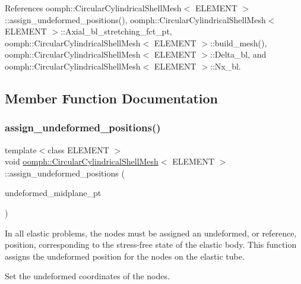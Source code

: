 References oomph\+::\+Circular\+Cylindrical\+Shell\+Mesh$<$ E\+L\+E\+M\+E\+N\+T $>$\+::assign\+\_\+undeformed\+\_\+positions(), oomph\+::\+Circular\+Cylindrical\+Shell\+Mesh$<$ E\+L\+E\+M\+E\+N\+T $>$\+::\+Axial\+\_\+bl\+\_\+stretching\+\_\+fct\+\_\+pt, oomph\+::\+Circular\+Cylindrical\+Shell\+Mesh$<$ E\+L\+E\+M\+E\+N\+T $>$\+::build\+\_\+mesh(), oomph\+::\+Circular\+Cylindrical\+Shell\+Mesh$<$ E\+L\+E\+M\+E\+N\+T $>$\+::\+Delta\+\_\+bl, and oomph\+::\+Circular\+Cylindrical\+Shell\+Mesh$<$ E\+L\+E\+M\+E\+N\+T $>$\+::\+Nx\+\_\+bl.



\subsection{Member Function Documentation}
\mbox{\label{classoomph_1_1CircularCylindricalShellMesh_a03bba13301e4dec893d73716e146c71d}} 
\subsubsection{\texorpdfstring{assign\+\_\+undeformed\+\_\+positions()}{assign\_undeformed\_positions()}}
{\footnotesize\ttfamily template$<$class E\+L\+E\+M\+E\+NT $>$ \\
void \hyperlink{classoomph_1_1CircularCylindricalShellMesh}{oomph\+::\+Circular\+Cylindrical\+Shell\+Mesh}$<$ E\+L\+E\+M\+E\+NT $>$\+::assign\+\_\+undeformed\+\_\+positions (\begin{DoxyParamCaption}\item[{\hyperlink{classoomph_1_1GeomObject}{Geom\+Object} $\ast$const \&}]{undeformed\+\_\+midplane\+\_\+pt }\end{DoxyParamCaption})}



In all elastic problems, the nodes must be assigned an undeformed, or reference, position, corresponding to the stress-\/free state of the elastic body. This function assigns the undeformed position for the nodes on the elastic tube. 

Set the undeformed coordinates of the nodes. 

